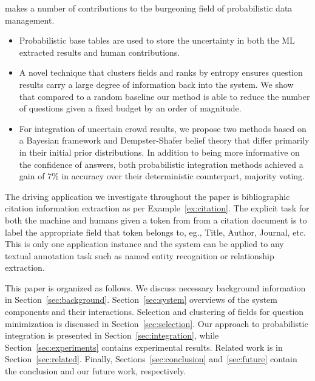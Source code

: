 {\sysName makes a number of contributions to the burgeoning field of probabilistic data management.
\begin{itemize}
\item Probabilistic base tables are used to store the uncertainty in both the ML extracted results and human contributions.
\item A novel technique that clusters fields and ranks by entropy ensures question results carry a large degree of information back into the system.  We show that compared to a random baseline our method is able to reduce the number of questions given a fixed budget by an order of magnitude.
\item For integration of uncertain crowd results, we propose two methods based on a Bayesian framework and Dempster-Shafer belief theory that differ primarily in their initial prior distributions.  In addition to being more informative on the confidence of answers, both probabilistic integration methods achieved a gain of 7\% in accuracy over their deterministic counterpart, majority voting.
\end{itemize}

The driving application we investigate throughout the paper is
bibliographic citation information extraction as per
Example~\ref{ex:citation}.  The explicit task for both the machine
and humans given a token from from a citation document is to label
the appropriate field that token belongs to, eg., Title, Author,
Journal, etc.  This is only one application instance and the
\sysName system can be applied to any textual annotation task such
as named entity recognition or relationship extraction.

This paper is organized as follows.  We discuss necessary background
information in Section~\ref{sec:background}.
Section~\ref{sec:system} overviews of the system components and
their interactions.  Selection and clustering of fields for question
minimization is discussed in Section~\ref{sec:selection}.  Our
approach to probabilistic integration is presented in
Section~\ref{sec:integration}, while Section~\ref{sec:experiments}
contains experimental results.  Related work is in
Section~\ref{sec:related}.  Finally, Sections~\ref{sec:conclusion}
and~\ref{sec:future} contain the conclusion and our future work,
respectively. }

